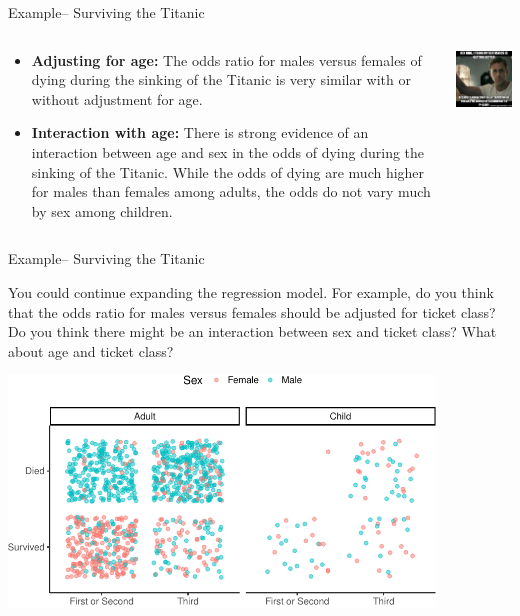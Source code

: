 \documentclass[ignorenonframetext,]{beamer}
\begin{document}
\begin{frame}{Example-- Surviving the Titanic}

\begin{columns}
\begin{column}{0.55\textwidth}
\begin{itemize}
\small
  \item \textbf{Adjusting for age:} The odds ratio for males versus females of dying during the sinking of the Titanic is very similar with or without adjustment for age. 
  \item \textbf{Interaction with age:} There is strong evidence of an interaction between age and sex in the odds of dying during the sinking of the Titanic. While the odds of dying are much higher for males than females among adults, the odds do not vary much by sex among children.
\end{itemize}
\end{column}

\begin{column}{0.45\textwidth}
\includegraphics{images/interaction.jpg}
\end{column}
\end{columns}

\end{frame}

\begin{frame}{Example-- Surviving the Titanic}

You could continue expanding the regression model. For example, do you
think that the odds ratio for males versus females should be adjusted
for ticket class? Do you think there might be an interaction between sex
and ticket class? What about age and ticket class?

\includegraphics[width=0.85\textwidth]{regression_files/figure-beamer/unnamed-chunk-14-1}

\end{frame}
\end{document}
